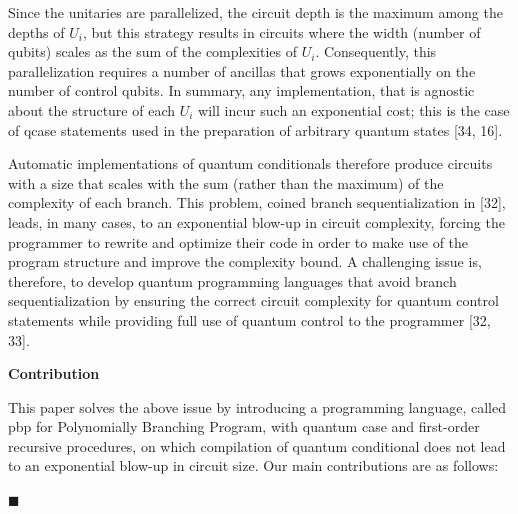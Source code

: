 \documentclass[10pt,a4paper]{amsart}
\begin{document}
 
 
Since the unitaries are parallelized, the circuit depth is the maximum among the depths of $U_{i}$, but this strategy results in circuits where the width (number of qubits) scales as the sum of the complexities of $U_{i}$. Consequently, this parallelization requires a number of ancillas that grows exponentially on the number of control qubits. In summary, any implementation, that is agnostic about the structure of each $U_{i}$ will incur such an exponential cost; this is the case of qcase statements used in the preparation of arbitrary quantum states [34, 16].\par
 
 
 
Automatic implementations of quantum conditionals therefore produce circuits with a size that scales with the sum (rather than the maximum) of the complexity of each branch. This problem, coined branch sequentialization in [32], leads, in many cases, to an exponential blow-up in circuit complexity, forcing the programmer to rewrite and optimize their code in order to make use of the program structure and improve the complexity bound. A challenging issue is, therefore, to develop quantum programming languages that avoid branch sequentialization by ensuring the correct circuit complexity for quantum control statements while providing full use of quantum control to the programmer [32, 33].\par
 
 
 
 
\par\medskip\noindent\textbf{Contribution}\par
 
 
This paper solves the above issue by introducing a programming language, called pbp for Polynomially Branching Program, with quantum case and first-order recursive procedures, on which compilation of quantum conditional does not lead to an exponential blow-up in circuit size. Our main contributions are as follows:\par
  
\par\noindent  $\blacksquare$ 
 
\end{document}
